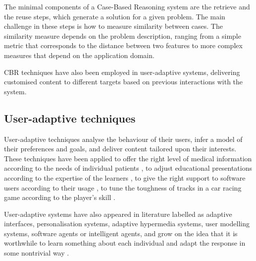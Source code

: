The minimal components of a Case-Based Reasoning system are the retrieve and the reuse steps, which generate a solution for a given problem. 
The main challenge in these steps is how to measure similarity between cases. %
The similarity measure depends on the problem description, ranging from a simple metric that corresponds to the distance between two features to more complex measures that depend on the application domain.

CBR techniques have also been employed in user-adaptive systems, delivering customised content to different targets based on previous interactions with the system.


% 
% 
% 



\subsection{User-adaptive techniques} %
\label{sub:user_adaptive_systems}


User-adaptive techniques analyse the behaviour of their users, infer a model of their preferences and goals, and deliver content tailored upon their interests. 
%
These techniques have been applied to %
offer the right level of medical information according to the needs of individual patients \cite{Hirst97}, to adjust educational presentations according to the expertise of the learners \cite{Hohl96}, to give the right support to software users according to their usage \cite{Horvitz98}, to tune the toughness of tracks in a car racing game according to the player's skill \cite{Togelius06}.

User-adaptive systems have also appeared in literature labelled as adaptive interfaces, personalisation systems, adaptive hypermedia systems, user modelling systems, software agents or intelligent agents, and grow on the idea that it is worthwhile to learn something about each individual and adapt the response in some nontrivial way \cite{Brusilovsky01,Montaner03}. 
%

